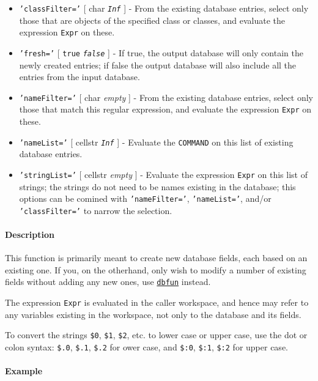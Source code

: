 \begin{itemize}
\item
  \texttt{'classFilter='} {[} char \textbar{} \emph{\texttt{Inf}} {]} -
  From the existing database entries, select only those that are objects
  of the specified class or classes, and evaluate the expression
  \texttt{Expr} on these.
\item
  \texttt{'fresh='} {[} \texttt{true} \textbar{} \emph{\texttt{false}}
  {]} - If true, the output database will only contain the newly created
  entries; if false the output database will also include all the
  entries from the input database.
\item
  \texttt{'nameFilter='} {[} char \textbar{} \emph{empty} {]} - From the
  existing database entries, select only those that match this regular
  expression, and evaluate the expression \texttt{Expr} on these.
\item
  \texttt{'nameList='} {[} cellstr \textbar{} \emph{\texttt{Inf}} {]} -
  Evaluate the \texttt{COMMAND} on this list of existing database
  entries.
\item
  \texttt{'stringList='} {[} cellstr \textbar{} \emph{empty} {]} -
  Evaluate the expression \texttt{Expr} on this list of strings; the
  strings do not need to be names existing in the database; this options
  can be comined with \texttt{'nameFilter='}, \texttt{'nameList='},
  and/or \texttt{'classFilter='} to narrow the selection.
\end{itemize}

\paragraph{Description}

This function is primarily meant to create new database fields, each
based on an existing one. If you, on the otherhand, only wish to modify
a number of existing fields without adding any new ones, use
\href{dbase/dbfun}{\texttt{dbfun}} instead.

The expression \texttt{Expr} is evaluated in the caller workspace, and
hence may refer to any variables existing in the workspace, not only to
the database and its fields.

To convert the strings \texttt{\$0}, \texttt{\$1}, \texttt{\$2}, etc. to
lower case or upper case, use the dot or colon syntax: \texttt{\$.0},
\texttt{\$.1}, \texttt{\$.2} for ower case, and \texttt{\$:0},
\texttt{\$:1}, \texttt{\$:2} for upper case.

\paragraph{Example}

